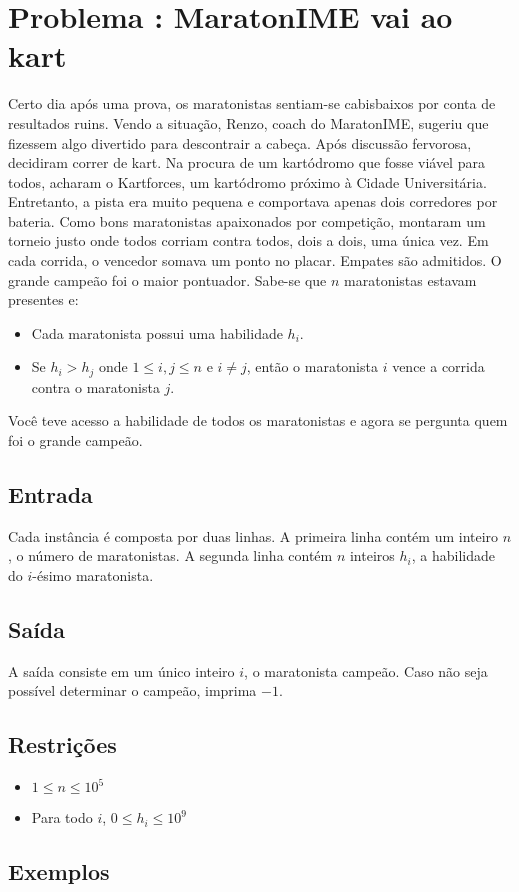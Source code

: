 \section*{Problema \proxLetra: MaratonIME vai ao kart}

Certo dia após uma prova, os maratonistas sentiam-se cabisbaixos por conta de resultados ruins. Vendo a situação, Renzo, coach do MaratonIME, sugeriu que fizessem algo divertido para descontrair a cabeça. Após discussão fervorosa, decidiram correr de kart. Na procura de um kartódromo que fosse viável para todos, acharam o Kartforces, um kartódromo próximo à Cidade Universitária. Entretanto, a pista era muito pequena e comportava apenas dois corredores por bateria. Como bons maratonistas apaixonados por competição, montaram um torneio justo onde todos corriam contra todos, dois a dois, uma única vez. Em cada corrida, o vencedor somava um ponto no placar. Empates são admitidos. O grande campeão foi o maior pontuador. Sabe-se que $n$ maratonistas estavam presentes e:

\begin{itemize}
	\item Cada maratonista possui uma habilidade $h_i$.
	\item Se $h_i > h_j$ onde $1 \leq i,j \leq n$ e $i \neq j$, então o maratonista $i$ vence a corrida contra o maratonista $j$.
\end{itemize}

Você teve acesso a habilidade de todos os maratonistas e agora se pergunta quem foi o grande campeão.

\subsection*{Entrada}

Cada instância é composta por duas linhas. 
A primeira linha contém um inteiro $n$, o número de maratonistas.
A segunda linha contém $n$ inteiros $h_i$, a habilidade do $i$-ésimo maratonista. 


\subsection*{Saída}

A saída consiste em um único inteiro $i$, o maratonista campeão. Caso não seja possível determinar o campeão, imprima $-1$.


\subsection*{Restrições}
\begin{itemize}
  \item $1 \leq n \leq 10^5$
  \item Para todo $i$, $0 \leq h_i \leq 10^9$
\end{itemize}

\subsection*{Exemplos}

\begin{center}
\end{center}
